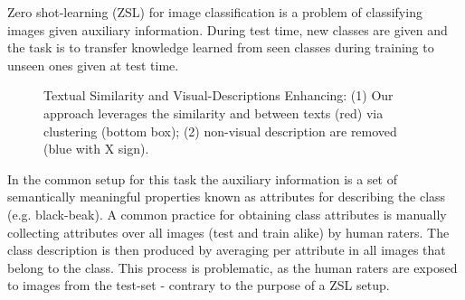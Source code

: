 \documentclass[11pt,a4paper]{article}
\begin{document}
Zero shot-learning (ZSL) for image classification 
is a problem of classifying images given auxiliary information. During test time, new classes are given and the task is to transfer knowledge learned from seen classes during training to unseen ones given at test time.


\begin{figure}[th]
\centering
{}
 \caption{Textual Similarity and Visual-Descriptions Enhancing: (1) Our approach leverages the similarity and  between texts (red) via clustering (bottom box); (2) non-visual description are removed (blue with X sign). }
\label{fig:bird_example}%
\end{figure}

In the common setup for this task the auxiliary information is a set of semantically meaningful properties known as attributes for describing the class (e.g. black-beak). A common practice for obtaining class attributes is manually collecting 
attributes over all images (test and train alike) by human raters. The class description is then produced by averaging per attribute in all images that belong to the class. This process is problematic, as the human raters are exposed to images from the test-set - contrary to the purpose of a ZSL setup.
\end{document}
